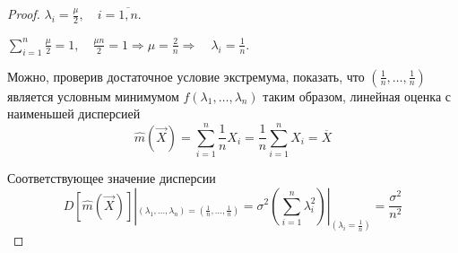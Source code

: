 \documentclass[a4paper, 12pt]{article}
\theoremstyle{definition}
\theoremstyle{leads}
\theoremstyle{example}
\begin{document}
\begin{proof}
$\lambda_i = \frac{\mu}{2}, \quad i = \overline{1, n}$.

$\sum_{i=1}^{n} \frac{\mu}{2} = 1,\quad \frac{\mu n }{2} = 1 \Longrightarrow  \mu = \frac{2}{n} \Longrightarrow \quad \lambda_i = \frac{1}{n}$.\newline

Можно, проверив достаточное условие экстремума, показать, что 
$(\frac{1}{n}, \dots, \frac{1}{n})$ является условным минимумом $f(\lambda_1, \dots, \lambda_n)$ таким образом, линейная оценка с наименьшей дисперсией 
\begin{equation*}
	\hat{m}(\vec{X}) = \sum_{i=1}^{n}\frac{1}{n} X_i = \frac{1}{n} \sum_{i=1}^{n}X_i = \overline{X}
\end{equation*}

Соответствующее значение дисперсии
\begin{equation*}
	D[\hat{m}(\vec{X})]|_{(\lambda_1, \dots, \lambda_n) = (\frac{1}{n}, \dots, \frac{1}{n})} = \sigma^2(\sum_{i=1}^{n}\lambda_i^2)|_{(\lambda_i = \frac{1}{n})} = \frac{\sigma^2}{n^2}
\end{equation*}
\end{proof}
\end{document}
